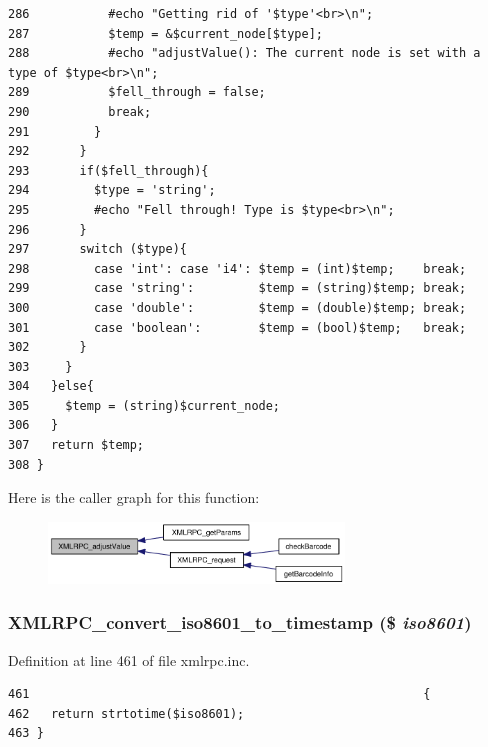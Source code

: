 \begin{Code}
\begin{verbatim}
286           #echo "Getting rid of '$type'<br>\n";
287           $temp = &$current_node[$type];
288           #echo "adjustValue(): The current node is set with a type of $type<br>\n";
289           $fell_through = false;
290           break;
291         }
292       }
293       if($fell_through){
294         $type = 'string';
295         #echo "Fell through! Type is $type<br>\n";
296       }
297       switch ($type){
298         case 'int': case 'i4': $temp = (int)$temp;    break;
299         case 'string':         $temp = (string)$temp; break;
300         case 'double':         $temp = (double)$temp; break;
301         case 'boolean':        $temp = (bool)$temp;   break;
302       }
303     }
304   }else{
305     $temp = (string)$current_node;
306   }
307   return $temp;
308 }
\end{verbatim}
\end{Code}




Here is the caller graph for this function:\nopagebreak
\begin{figure}[H]
\begin{center}
\leavevmode
\includegraphics[width=223pt]{xmlrpc_8inc_d936fe41ae9c3e0b90bd72ffe82a2969_icgraph}
\end{center}
\end{figure}
\hypertarget{xmlrpc_8inc_1d9c2ef61c9f1fd2723d06d1364ef845}{
\subsubsection{\setlength{\rightskip}{0pt plus 5cm}XMLRPC\_\-convert\_\-iso8601\_\-to\_\-timestamp (\$ {\em iso8601})}}
\label{xmlrpc_8inc_1d9c2ef61c9f1fd2723d06d1364ef845}




Definition at line 461 of file xmlrpc.inc.

\begin{Code}\begin{verbatim}461                                                       {
462   return strtotime($iso8601);
463 }
\end{verbatim}
\end{Code}



